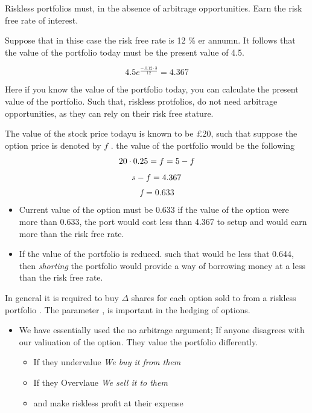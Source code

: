 \documentclass{article}
\theoremstyle{mytheoremstyle}
\theoremstyle{mytheoremstyle}
\theoremstyle{myproblemstyle}
\begin{document}
Riskless portfolios must, in the absence of arbitrage opportunities. Earn the risk free rate of interest.

Suppose that in thise case the risk free rate is 12 \% er annumn. It follows that the value of the portfolio today must be the present value of 4.5.

$$ 4.5 e^{\frac{-.0.12 \cdot 3}{12}} = 4.367 $$

Here if you know the value of the portfolio today, you can calculate the present value of the portfolio.
Such that, riskless protfolios, do not need arbitrage opportunities, as they can rely on their risk free stature.

The value of the stock price todayu is known to be £20, such that suppose the option price is denoted by $f$ . the value of the portfolio would be the following \\

\[
	20 \cdot 0.25 = f = 5 - f \\
\]
\[
	s - f = 4.367 \\
\]
\[
	f = 0.633
\]

\begin{itemize}
	\item Current value of the option must be 0.633 if the value of the option were more than 0.633, the port would cost less than 4.367 to setup and would earn more than the risk free rate.
	\item If the value of the portfolio is reduced. such that would be less that 0.644, then \textit{shorting} the portfolio would provide a way of borrowing money at a less than the risk free rate.
\end{itemize}

In general it is required to buy $\Delta$ shares for each option sold to from a riskless portfolio .
The parameter \Delta, is important in the hedging of options.

\begin{itemize}
	\item We have essentially used the no arbitrage argument; If anyone disagrees with our valiuation of the option. They value the portfolio differently.
	      \begin{itemize}
		      \item If they undervalue \textit{We buy it from them}
		      \item If they Overvlaue \textit{We sell it to them}
		      \item and make riskless profit at their expense
	      \end{itemize}
\end{itemize}
\end{document}
